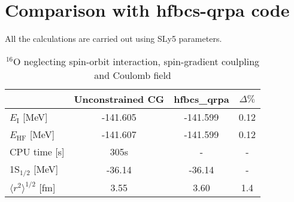 \section{Comparison with hfbcs-qrpa code}
All the calculations are carried out using SLy5 parameters. 
\begin{table}[ht]
  \centering
  \label{tab:confronto}
  \begin{tabular}{lccc}
    \toprule
    & Unconstrained CG & hfbcs\_qrpa & $\Delta\%$ \\
    \midrule
    $E_\text{I}$ [MeV] & -141.605 & -141.599 & 0.12 \\
    $E_\text{HF}$ [MeV] & -141.607 & -141.599 & 0.12 \\
    CPU time [s]& 305s & - & -\\
    1S$_{1/2}$ [MeV] & -36.14 & -36.14 & -\\
    
    $\langle r^2 \rangle^{1/2}$ [fm] & 3.55 & 3.60 & 1.4 \\
    \bottomrule
  \end{tabular}
  \caption{$^{16}$O neglecting spin-orbit interaction, spin-gradient coulpling and Coulomb field}
\end{table}
